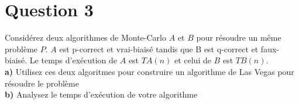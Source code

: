 \documentclass[devoir4.tex]{subfiles}
\begin{document}
\section*{Question 3}
Considérez deux algorithmes de Monte-Carlo \(A\) et \(B\) pour résoudre un même problème \(P\). \(A\) est p-correct et vrai-biaisé tandis que B est q-correct et faux-biaisé. Le temps d’exécution de \(A\) est \(TA(n)\) et celui de \(B\) est \(TB(n)\). \\

\textbf{a)} Utilisez ces deux algoritmes pour construire un algorithme de Las Vegas pour résoudre le problème \\

\textbf{b)} Analysez le temps d'exécution de votre algorithme\\
\end{document}
